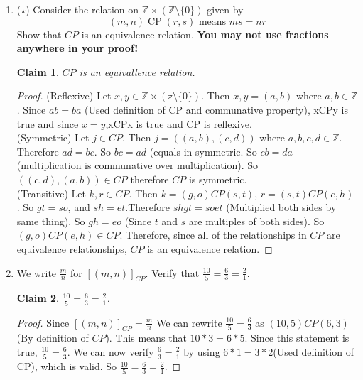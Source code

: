 \documentclass[11pt]{letter}
\newtheorem{claim}{Claim}
\theoremstyle{definition}
\begin{document}
\begin{description}
\begin{enumerate}
			\item ($\star$) Consider the relation on $\mathbb{Z}\times(\mathbb{Z}\setminus \{0\})$ given by
			$$(m,n)\operatorname{CP}(r,s)\text{ means } ms=nr$$
			  Show that $CP$ is an equivalence relation. {\bfseries You may not use fractions anywhere in your proof!}
                          \begin{claim}
                          $CP$ is an equivallence relation.  
                          \end{claim}
                          \begin{proof}
                            (Reflexive) Let $x,y\in \mathbb{Z}\times \left(\mathbb{z}\setminus \{ 0\}\right)$. Then $x,y=(a,b)$ where $a,b\in \mathbb{Z}$. Since $ab=ba$ (Used definition of CP and communative property), xCPy is true and since $x=y$,xCPx is true and CP is reflexive.\\
                            (Symmetric) Let $j\in CP$. Then $j=((a,b),(c,d))$ where $a,b,c,d\in \mathbb{Z}$. Therefore $ad=bc$. So $bc=ad$ (equals in symmetric. So $cb=da$ (multiplication is communative over multiplication). So $((c,d),(a,b))\in CP$ therefore $CP$ is symmetric.\\
                            (Transitive) Let $k,r\in CP$. Then $k=(g,o)CP(s,t)$, $r=(s,t)CP(e,h)$ . So $gt=so$, and $sh=et$.Therefore $shgt=soet$ (Multiplied both sides by same thing). So $gh=eo$ (Since $t$ and $s$ are multiples of both sides). So $(g,o)CP(e,h)\in CP$. Therefore, since all of the relationships in $CP$ are equivalence relationships, $CP$ is an equivalence relation. 
                          \end{proof}

                        \item We write $\frac{m}{n}$ for $[(m,n)]_{CP}$. Verify that $\frac{10}{5}=\frac{6}{3}=\frac{2}{1}$.
                          \begin{claim}
                            $\frac{10}{5}=\frac{6}{3}=\frac{2}{1}$.
                          \end{claim}
                          \begin{proof}
                            Since $[(m,n)]_{CP}=\frac{m}{n}$ We can rewrite $\frac{10}{5}=\frac{6}{3}$ as $(10,5)CP(6,3)$ (By definition of $CP$). This means that $10*3=6*5$. Since this statement is true, $\frac{10}{5}=\frac{6}{3}$. We can now verify $\frac{6}{3}=\frac{2}{1}$ by using $6*1=3*2$(Used definition of CP), which is valid. So $\frac{10}{5}=\frac{6}{3}=\frac{2}{1}$.
                          \end{proof}
                          

\end{enumerate}
\end{description}
\end{document}
